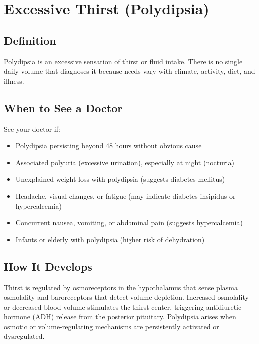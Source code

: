 \chapter{Excessive Thirst (Polydipsia)}

\section*{Definition}
Polydipsia is an excessive sensation of thirst or fluid intake. There is no single daily volume that diagnoses it because needs vary with climate, activity, diet, and illness.

\section*{When to See a Doctor}
See your doctor if:
\begin{itemize}
  \item Polydipsia persisting beyond 48 hours without obvious cause
  \item Associated polyuria (excessive urination), especially at night (nocturia)
  \item Unexplained weight loss with polydipsia (suggests diabetes mellitus)
  \item Headache, visual changes, or fatigue (may indicate diabetes insipidus or hypercalcemia)
  \item Concurrent nausea, vomiting, or abdominal pain (suggests hypercalcemia)
  \item Infants or elderly with polydipsia (higher risk of dehydration)
\end{itemize}

\section*{How It Develops}
Thirst is regulated by osmoreceptors in the hypothalamus that sense plasma osmolality and baroreceptors that detect volume depletion. Increased osmolality or decreased blood volume stimulates the thirst center, triggering antidiuretic hormone (ADH) release from the posterior pituitary. Polydipsia arises when osmotic or volume-regulating mechanisms are persistently activated or dysregulated.

